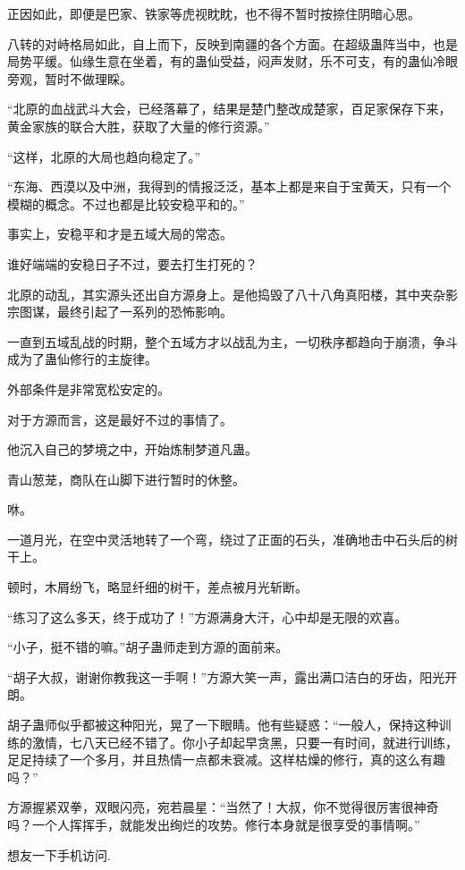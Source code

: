 \begin{this_body}
正因如此，即便是巴家、铁家等虎视眈眈，也不得不暂时按捺住阴暗心思。

八转的对峙格局如此，自上而下，反映到南疆的各个方面。在超级蛊阵当中，也是局势平缓。仙缘生意在坐着，有的蛊仙受益，闷声发财，乐不可支，有的蛊仙冷眼旁观，暂时不做理睬。

“北原的血战武斗大会，已经落幕了，结果是楚门整改成楚家，百足家保存下来，黄金家族的联合大胜，获取了大量的修行资源。”

“这样，北原的大局也趋向稳定了。”

“东海、西漠以及中洲，我得到的情报泛泛，基本上都是来自于宝黄天，只有一个模糊的概念。不过也都是比较安稳平和的。”

事实上，安稳平和才是五域大局的常态。

谁好端端的安稳日子不过，要去打生打死的？

北原的动乱，其实源头还出自方源身上。是他捣毁了八十八角真阳楼，其中夹杂影宗图谋，最终引起了一系列的恐怖影响。

一直到五域乱战的时期，整个五域方才以战乱为主，一切秩序都趋向于崩溃，争斗成为了蛊仙修行的主旋律。

外部条件是非常宽松安定的。

对于方源而言，这是最好不过的事情了。

他沉入自己的梦境之中，开始炼制梦道凡蛊。

青山葱茏，商队在山脚下进行暂时的休整。

咻。

一道月光，在空中灵活地转了一个弯，绕过了正面的石头，准确地击中石头后的树干上。

顿时，木屑纷飞，略显纤细的树干，差点被月光斩断。

“练习了这么多天，终于成功了！”方源满身大汗，心中却是无限的欢喜。

“小子，挺不错的嘛。”胡子蛊师走到方源的面前来。

“胡子大叔，谢谢你教我这一手啊！”方源大笑一声，露出满口洁白的牙齿，阳光开朗。

胡子蛊师似乎都被这种阳光，晃了一下眼睛。他有些疑惑：“一般人，保持这种训练的激情，七八天已经不错了。你小子却起早贪黑，只要一有时间，就进行训练，足足持续了一个多月，并且热情一点都未衰减。这样枯燥的修行，真的这么有趣吗？”

方源握紧双拳，双眼闪亮，宛若晨星：“当然了！大叔，你不觉得很厉害很神奇吗？一个人挥挥手，就能发出绚烂的攻势。修行本身就是很享受的事情啊。”

想友一下手机访问.

\end{this_body}

